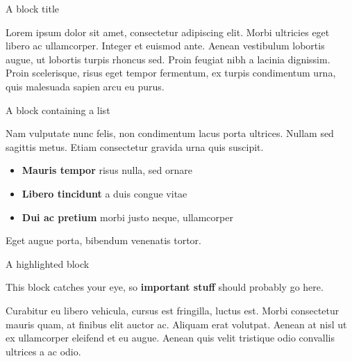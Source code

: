 \documentclass[final, xcolor={svgnames}]{beamer}
\newlength{\colwidth}
\begin{document}
\begin{frame}[t]
\begin{columns}[t]
\begin{column}{\colwidth}
\begin{block}{A block title}

    Lorem ipsum dolor sit amet, consectetur adipiscing elit. Morbi ultricies
    eget libero ac ullamcorper. Integer et euismod ante. Aenean vestibulum
    lobortis augue, ut lobortis turpis rhoncus sed. Proin feugiat nibh a
    lacinia dignissim. Proin scelerisque, risus eget tempor fermentum, ex
    turpis condimentum urna, quis malesuada sapien arcu eu purus.

  \end{block}

  \begin{block}{A block containing a list}

    Nam vulputate nunc felis, non condimentum lacus porta ultrices. Nullam sed
    sagittis metus. Etiam consectetur gravida urna quis suscipit.

    \begin{itemize}
      \item \textbf{Mauris tempor} risus nulla, sed ornare
      \item \textbf{Libero tincidunt} a duis congue vitae
      \item \textbf{Dui ac pretium} morbi justo neque, ullamcorper
    \end{itemize}

    Eget augue porta, bibendum venenatis tortor.

  \end{block}

  \begin{alertblock}{A highlighted block}

    This block catches your eye, so \textbf{important stuff} should probably go
    here.

    Curabitur eu libero vehicula, cursus est fringilla, luctus est. Morbi
    consectetur mauris quam, at finibus elit auctor ac. Aliquam erat volutpat.
    Aenean at nisl ut ex ullamcorper eleifend et eu augue. Aenean quis velit
    tristique odio convallis ultrices a ac odio.


\end{alertblock}
\end{column}
\end{columns}
\end{frame}
\end{document}
